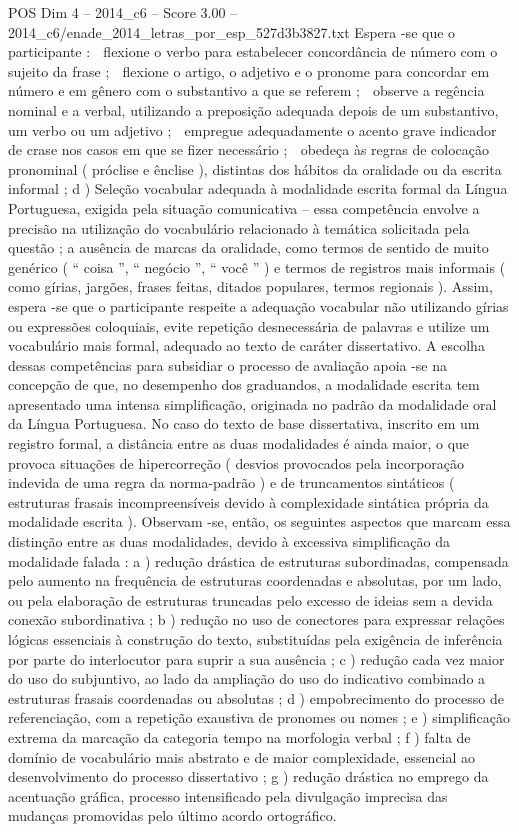 \begin{textsample}{POS Dim 4 – 2014\_c6 – Score 3.00 – 2014\_c6/enade\_2014\_letras\_por\_esp\_527d3b3827.txt}
Espera -se que o participante :  flexione o verbo para estabelecer concordância de número com o sujeito da frase ;  flexione o artigo, o adjetivo e o pronome para concordar em número e em gênero com o substantivo a que se referem ;  observe a regência nominal e a verbal, utilizando a preposição adequada depois de um substantivo, um verbo ou um adjetivo ;  empregue adequadamente o acento grave indicador de crase nos casos em que se fizer necessário ;  obedeça às regras de colocação pronominal ( próclise e ênclise ), distintas dos hábitos da oralidade ou da escrita informal ; d ) Seleção vocabular adequada à modalidade escrita formal da Língua Portuguesa, exigida pela situação comunicativa – essa competência envolve a precisão na utilização do vocabulário relacionado à temática solicitada pela questão ; a ausência de marcas da oralidade, como termos de sentido de muito genérico ( “ coisa ”, “ negócio ”, “ você ” ) e termos de registros mais informais ( como gírias, jargões, frases feitas, ditados populares, termos regionais ).
Assim, espera -se que o participante respeite a adequação vocabular não utilizando gírias ou expressões coloquiais, evite repetição desnecessária de palavras e utilize um vocabulário mais formal, adequado ao texto de caráter dissertativo.
A escolha dessas competências para subsidiar o processo de avaliação apoia -se na concepção de que, no desempenho dos graduandos, a modalidade escrita tem apresentado uma intensa simplificação, originada no padrão da modalidade oral da Língua Portuguesa.
No caso do texto de base dissertativa, inscrito em um registro formal, a distância entre as duas modalidades é ainda maior, o que provoca situações de hipercorreção ( desvios provocados pela incorporação indevida de uma regra da norma-padrão ) e de truncamentos sintáticos ( estruturas frasais incompreensíveis devido à complexidade sintática própria da modalidade escrita ).
Observam -se, então, os seguintes aspectos que marcam essa distinção entre as duas modalidades, devido à excessiva simplificação da modalidade falada : a ) redução drástica de estruturas subordinadas, compensada pelo aumento na frequência de estruturas coordenadas e absolutas, por um lado, ou pela elaboração de estruturas truncadas pelo excesso de ideias sem a devida conexão subordinativa ; b ) redução no uso de conectores para expressar relações lógicas essenciais à construção do texto, substituídas pela exigência de inferência por parte do interlocutor para suprir a sua ausência ; c ) redução cada vez maior do uso do subjuntivo, ao lado da ampliação do uso do indicativo combinado a estruturas frasais coordenadas ou absolutas ; d ) empobrecimento do processo de referenciação, com a repetição exaustiva de pronomes ou nomes ; e ) simplificação extrema da marcação da categoria tempo na morfologia verbal ; f ) falta de domínio de vocabulário mais abstrato e de maior complexidade, essencial ao desenvolvimento do processo dissertativo ; g ) redução drástica no emprego da acentuação gráfica, processo intensificado pela divulgação imprecisa das mudanças promovidas pelo último acordo ortográfico.

\end{textsample}
